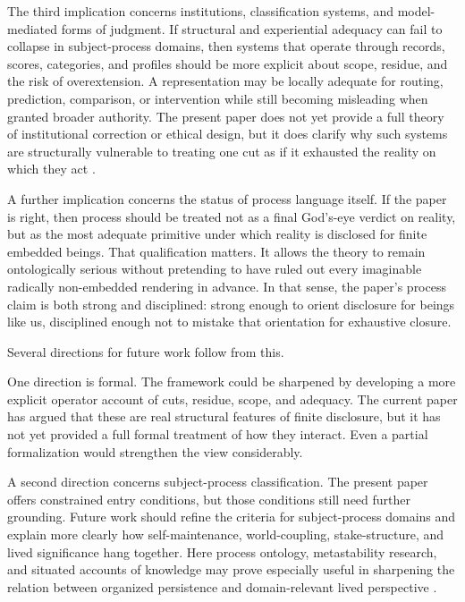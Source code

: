 \documentclass[11pt]{article}
\begin{document}
The third implication concerns institutions, classification systems, and model-mediated forms of judgment. If structural and experiential adequacy can fail to collapse in subject-process domains, then systems that operate through records, scores, categories, and profiles should be more explicit about scope, residue, and the risk of overextension. A representation may be locally adequate for routing, prediction, comparison, or intervention while still becoming misleading when granted broader authority. The present paper does not yet provide a full theory of institutional correction or ethical design, but it does clarify why such systems are structurally vulnerable to treating one cut as if it exhausted the reality on which they act \cite{BowkerStar1999,Fricker2007,ONeil2016,Eubanks2018,ObermeyerEtAl2019}.

A further implication concerns the status of process language itself. If the paper is right, then process should be treated not as a final God's-eye verdict on reality, but as the most adequate primitive under which reality is disclosed for finite embedded beings. That qualification matters. It allows the theory to remain ontologically serious without pretending to have ruled out every imaginable radically non-embedded rendering in advance. In that sense, the paper's process claim is both strong and disciplined: strong enough to orient disclosure for beings like us, disciplined enough not to mistake that orientation for exhaustive closure.

Several directions for future work follow from this.

One direction is formal. The framework could be sharpened by developing a more explicit operator account of cuts, residue, scope, and adequacy. The current paper has argued that these are real structural features of finite disclosure, but it has not yet provided a full formal treatment of how they interact. Even a partial formalization would strengthen the view considerably.

A second direction concerns subject-process classification. The present paper offers constrained entry conditions, but those conditions still need further grounding. Future work should refine the criteria for subject-process domains and explain more clearly how self-maintenance, world-coupling, stake-structure, and lived significance hang together. Here process ontology, metastability research, and situated accounts of knowledge may prove especially useful in sharpening the relation between organized persistence and domain-relevant lived perspective \cite{Whitehead1978,Rescher1996,TognoliKelso2014,Haraway1988,Polanyi1958}.
\end{document}

